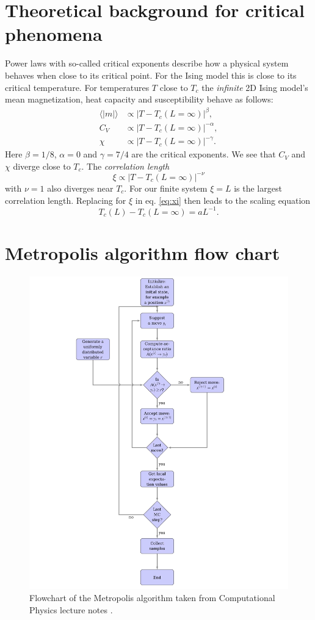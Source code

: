 \documentclass[english,notitlepage,reprint,nofootinbib]{revtex4-1}  %
\begin{document}
\section{Theoretical background for critical phenomena}\label{appendix:critical}
Power laws with so-called critical exponents describe how a physical system behaves when close to its critical point. For the Ising model this is close to its critical temperature. For temperatures $T$ close to $T_c$ the \textit{infinite} 2D Ising model's mean magnetization, heat capacity and susceptibility behave as follows: 
\begin{align*}
    \langle |m| \rangle &\propto |T-T_c(L = \infty)|^\beta, \\
    C_V &\propto |T-T_c(L = \infty)|^{-\alpha}, \\
    \chi &\propto |T-T_c(L = \infty)|^{-\gamma}. 
\end{align*}
Here $\beta = 1/8$, $\alpha = 0$ and $\gamma = 7/4$ are the critical exponents. We see that $C_V$ and $\chi$ diverge close to $T_c$. The \textit{correlation length}
\begin{equation}
    \xi \propto |T-T_c(L=\infty)|^{-\nu} \label{eq:xi}
\end{equation}
with $\nu=1$ also diverges near $T_c$. For our finite system $\xi = L$ is the largest correlation length. Replacing for $\xi$ in eq. \ref{eq:xi} then leads to the scaling equation
\begin{equation}
    T_c(L) -T_c(L=\infty) = aL^{-1}.
\end{equation}

\section{Metropolis algorithm flow chart}\label{appendix:metro}

\begin{figure}[H]
    \centering
    \includegraphics[width=1\textwidth]{../figures//metro_flow.pdf}
    \caption{Flowchart of the Metropolis algorithm taken from Computational Physics lecture notes \cite{compedium}.}
    \label{fig:metro_flow}
\end{figure}
\end{document}

